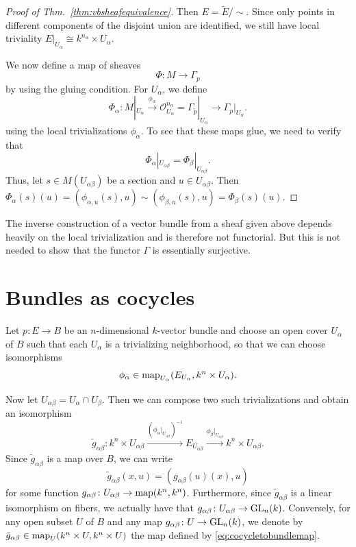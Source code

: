 \documentclass[a4paper,openany]{scrbook}
\begin{document}
\begin{proof}[Proof of Thm.~\ref{thm:vbsheafequivalence}]
Then $E = \tilde E/\sim$. Since only points in different components of the disjoint union are identified, we still have local triviality $E|_{U_\alpha} \cong k^{n_\alpha} \times U_\alpha$. 

We now define a map of sheaves
\[
\Phi\colon M \to \Gamma_p
\]
by using the gluing condition. For $U_\alpha$, we define
\[
\Phi_\alpha\colon M|_{U_\alpha} \xrightarrow{\phi_\alpha} \mathcal O_{U_\alpha}^{n_\alpha} = \Gamma_{\tilde p}|_{U_\alpha} \to \Gamma_p|_{U_\alpha}.
\]
using the local trivializations $\phi_\alpha$. To see that these maps glue, we need to verify that
\[
\Phi_\alpha|_{U_{\alpha\beta}} = \Phi_\beta|_{U_{\alpha\beta}}.
\]
Thus, let $s \in M(U_{\alpha\beta})$ be a section and $u \in U_{\alpha\beta}$. Then $\Phi_\alpha(s)(u) = (\phi_{\alpha,u}(s),u) \sim (\phi_{\beta,u}(s),u) = \Phi_\beta(s)(u)$.
\end{proof}

\begin{remark}
The inverse construction of a vector bundle from a sheaf given above depends heavily on the local trivialization and is therefore not functorial. But this is not needed to show that the functor $\Gamma$ is essentially surjective.
\end{remark}


\section{Bundles as cocycles}

Let $p\colon E \to B$ be an $n$-dimensional $k$-vector bundle and choose an open cover $U_\alpha$ of $B$ such that each $U_\alpha$ is a trivializing neighborhood, so that we can choose isomorphisms
\[
\phi_\alpha \in \operatorname{map}_{U_\alpha}(E_{U_\alpha},k^n \times U_{\alpha}).
\]

Now let $U_{\alpha\beta} = U_\alpha \cap U_\beta$. Then we can compose two such trivializations and obtain an isomorphism
\[
\tilde g_{\alpha\beta}\colon k^{n} \times U_{\alpha\beta} \xrightarrow{(\phi_\alpha|_{U_{\alpha\beta}})^{-1}} E_{U_{\alpha\beta}} \xrightarrow{\phi_\beta|_{U_{\alpha\beta}}} k^{n} \times U_{\alpha\beta}.
\]
Since $\tilde g_{\alpha\beta}$ is a map over $B$, we can write
\begin{equation}\label{eq:cocycletobundlemap}
\tilde g_{\alpha\beta}(x,u) = (g_{\alpha\beta}(u)(x),u)
\end{equation}
for some function $g_{\alpha\beta}\colon U_{\alpha\beta} \to \operatorname{map}(k^{n},k^{n})$. Furthermore, since $\tilde g_{\alpha\beta}$ is a linear isomorphism on fibers, we actually have that $g_{\alpha\beta}\colon U_{\alpha\beta} \to \operatorname{GL}_{n}(k)$. Conversely, for any open subset $U$ of $B$ and any map $g_{\alpha\beta}\colon U \to \operatorname{GL}_n(k)$, we denote by $\tilde g_{\alpha\beta}\in \operatorname{map}_{U}(k^n \times U,k^n \times U)$ the map defined by \eqref{eq:cocycletobundlemap}.
\end{document}
